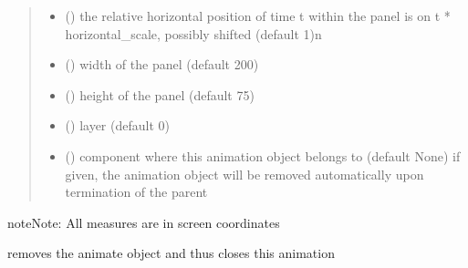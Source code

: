 \documentclass[letterpaper,10pt,english]{sphinxmanual}
\begin{document}
\begin{fulllineitems}
\begin{quote}
\begin{description}
\begin{itemize}
\item {} 
 () \textendash{} the relative horizontal position of time t within the panel is on
t * horizontal\_scale, possibly shifted (default 1)\textbar{}n\textbar{}

\item {} 
 () \textendash{} width of the panel (default 200)

\item {} 
 () \textendash{} height of the panel (default 75)

\item {} 
 () \textendash{} layer (default 0)

\item {} 
 ({\hyperref[\detokenize{Reference:salabim.Component}]{}}) \textendash{} component where this animation object belongs to (default None) 
if given, the animation object will be removed
automatically upon termination of the parent

\end{itemize}

\end{description}\end{quote}

\begin{sphinxadmonition}{note}{Note:}
All measures are in screen coordinates 
\end{sphinxadmonition}

\begin{fulllineitems}
\label{\detokenize{Reference:salabim.AnimateMonitor.remove}}
removes the animate object and thus closes this animation

\end{fulllineitems}


\end{fulllineitems}

\end{document}
